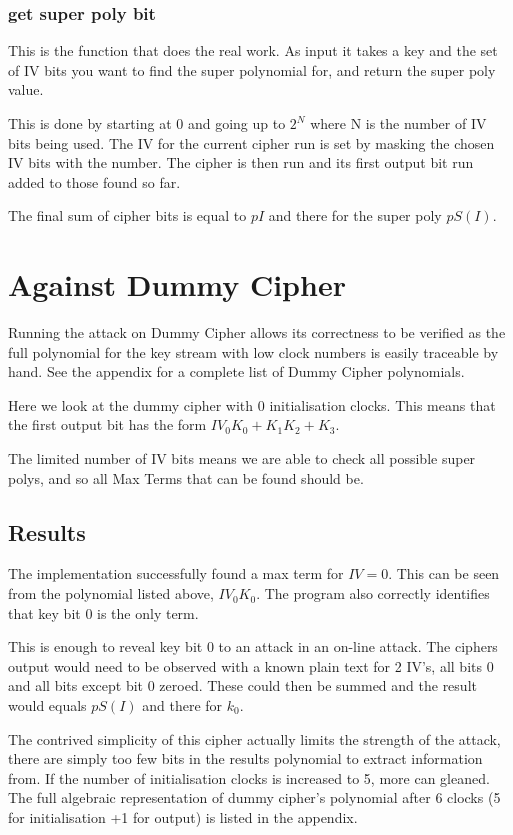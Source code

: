 \documentclass{report}
\let\Oldsection\section
\renewcommand{\section}{\FloatBarrier\Oldsection}
\let\Oldsubsection\subsection
\renewcommand{\subsection}{\FloatBarrier\Oldsubsection}
\let\Oldsubsubsection\subsubsection
\renewcommand{\subsubsection}{\FloatBarrier\Oldsubsubsection}
\begin{document}
\subsubsection{get super poly bit}
This is the function that does the real work. As input it takes a key and the set of IV bits you want to find the super polynomial for, and return the super poly value.

This is done by starting at 0 and going up to $2^N$ where N is the number of IV bits being used. The IV for the current cipher run is set by masking the chosen IV bits with the number. The cipher is then run and its first output bit run added to those found so far.

The final sum of cipher bits is equal to $pI$ and there for the super poly $pS(I)$.
\section{Against Dummy Cipher}
Running the attack on Dummy Cipher allows its correctness to be verified as the full polynomial for the key stream with low clock numbers is easily traceable by hand. See the appendix for a complete list of Dummy Cipher polynomials.

Here we look at the dummy cipher with 0 initialisation clocks. This means that the first output bit has the form $IV_0K_0+K_1K_2+K_3$.

The limited number of IV bits means we are able to check all possible super polys, and so all Max Terms that can be found should be.
\subsection{Results}
The implementation successfully found a max term for $IV={0}$. This can be seen from the polynomial listed above, $IV_0K_0$. The program also correctly identifies that key bit 0 is the only term.

This is enough to reveal key bit 0 to an attack in an on-line attack. The ciphers output would need to be observed with a known plain text for 2 IV's, all bits 0 and all bits except bit 0 zeroed. These could then be summed and the result would equals $pS(I)$ and there for $k_0$.

The contrived simplicity of this cipher actually limits the strength of the attack, there are simply too few bits in the results polynomial to extract information from. If the number of initialisation clocks is increased to 5, more can gleaned. The full algebraic representation of dummy cipher's polynomial after 6 clocks (5 for initialisation +1 for output) is listed in the appendix.
\end{document}
